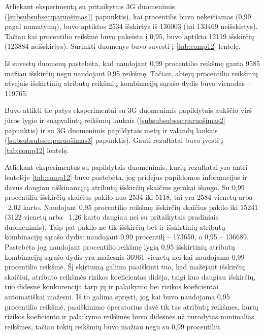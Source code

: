 \documentclass{VUMIFPSbakalaurinis}
\begin{document}
Atliekant eksperimentą su pritaikytais 3G duomenimis (\ref{subsubsubsec:paruošimas1} papunktis), kai procentilis buvo nekeičiamas (0,99 pagal numatymą), buvo aptiktos 2534 išskirtys iš 136003 (tai 133469 neišskirtys). Tačiau kai procentilio reikšmė buvo pakeista į 0,95, buvo aptikta 12119 išskirčių (123884 neišskirtys). Surinkti duomenys buvo suvesti į \ref{tab:comp12} lentelę.\par

Iš suvestų duomenų pastebėta, kad naudojant 0,99 procentilio reikšmę gauta 9585	mažiau išskirčių negu naudojant 0,95 reikšmę. Tačiau, abiejų procentilio reikšmių atvejais išskirtinių atributų reikšmių kombinacijų sąrašo dydis buvo vienodas – 119765.\par

Buvo atlikti tie patys eksperimentai su 3G duomenimis papildytais aukščio virš jūros lygio ir suapvalintų reikšmių laukais (\ref{subsubsubsec:paruošimas2} papunktis) ir su 3G duomenimis papildytais metų ir valandų laukais (\ref{subsubsubsec:paruošimas3} papunktis). Gauti rezultatai buvo įvesti į \ref{tab:comp12} lentelę.\par

Atliekant eksperimentus su papildytais duomenimis, kurių rezultatai yra antri lentelėje \ref{tab:comp12} buvo pastebėta, jog pridėjus papildomos informacijos ir davus daugiau aiškinamųjų atributų išskirčių skaičius gerokai išaugo. Su 0,99 procentiliu išskirčių skaičius pakilo nuo 2534 iki 5118, tai yra 2584 vienetų arba ~2.02 karto. Naudojant 0,95 procentilio reikšmę išskirčių skaičius pakilo iki 15241 (3122 vienetų arba ~1,26 karto daugiau nei su pritaikytais pradiniais duomenimis). Taip pat pakilo ne tik išskirčių bet ir išskirtinių atributų kombinacijų sąrašo dydis: naudojant 0,99 procentilį – 173650, o 0,95 – 136689. Pastebėta jog naudojant procentilio reikšmę lygią 0,95 išskirtinių atributų kombinacijų sąrašo dydis yra mažesnis 36961 vienetų nei kai naudojama 0,99 procentilio reikšmė. Šį skirtumą galima paaiškinti tuo, kad mažėjant išskirčių skaičiui, atributo reikšmės rizikos koeficientas didėja, taigi kuo daugiau išskirčių, tuo didesnė konkurencija tarp jų ir palaikymo bei rizikos koeficientai automatiškai mažesni. Iš to galima spręsti, jog kai buvo naudojama 0,95 procentilio reikšmė, paaiškinimo operatorius davė tik tas atributų reikšmes, kurių rizikos koeficiento ir palaikymo reikšmės buvo didesnės už nurodytas minimalias reikšmes, tačiau tokių reikšmių buvo mažiau negu su 0,99 procentiliu.\par
\end{document}
